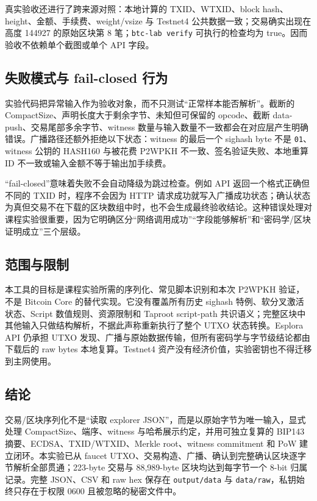 \documentclass[11pt,a4paper,fontset=none]{ctexart}
\begin{document}
真实验收还进行了跨来源对照：本地计算的 TXID、WTXID、block hash、height、金额、手续费、weight/vsize 与 Testnet4 公共数据一致；交易确实出现在高度 144927 的原始区块第 8 笔；\texttt{btc-lab verify} 可执行的检查均为 true。因而验收不依赖单个截图或单个 API 字段。

\subsection{失败模式与 fail-closed 行为}

实验代码把异常输入作为验收对象，而不只测试“正常样本能否解析”。截断的 CompactSize、声明长度大于剩余字节、未知但可保留的 opcode、截断 data-push、交易尾部多余字节、witness 数量与输入数量不一致都会在对应层产生明确错误。广播路径还额外拒绝以下状态：witness 的最后一个 sighash byte 不是 \texttt{01}、witness 公钥的 HASH160 与被花费 P2WPKH 不一致、签名验证失败、本地重算 ID 不一致或输入金额不等于输出加手续费。

“fail-closed”意味着失败不会自动降级为跳过检查。例如 API 返回一个格式正确但不同的 TXID 时，程序不会因为 HTTP 请求成功就写入广播成功状态；确认状态为真但交易不在下载的区块数组中时，也不会生成最终验收结论。这种错误处理对课程实验很重要，因为它明确区分“网络调用成功”“字段能够解析”和“密码学/区块证明成立”三个层级。

\subsection{范围与限制}

本工具的目标是课程实验所需的序列化、常见脚本识别和本次 P2WPKH 验证，不是 Bitcoin Core 的替代实现。它没有覆盖所有历史 sighash 特例、软分叉激活状态、Script 数值规则、资源限制和 Taproot script-path 共识语义；完整区块中其他输入只做结构解析，不据此声称重新执行了整个 UTXO 状态转换。Esplora API 仍承担 UTXO 发现、广播与原始数据传输，但所有密码学与字节级结论都由下载后的 raw bytes 本地复算。Testnet4 资产没有经济价值，实验密钥也不得迁移到主网使用。

\subsection{结论}

交易/区块序列化不是“读取 explorer JSON”，而是以原始字节为唯一输入，显式处理 CompactSize、端序、witness 与哈希展示约定，并用可独立复算的 BIP143 摘要、ECDSA、TXID/WTXID、Merkle root、witness commitment 和 PoW 建立闭环。本实验已从 faucet UTXO、交易构造、广播、确认到完整确认区块逐字节解析全部贯通；223-byte 交易与 88,989-byte 区块均达到每字节一个 8-bit 归属记录。完整 JSON、CSV 和 raw hex 保存在 \texttt{output/data} 与 \texttt{data/raw}，私钥始终只存在于权限 0600 且被忽略的秘密文件中。
\end{document}
